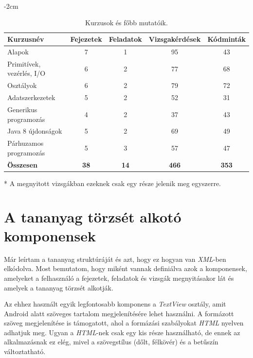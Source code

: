 \documentclass[12pt,a4paper]{article}
\newcommand{\xml}{\textit{XML}\xspace}
\begin{document}
	\bigskip
	\begin{table}[h!]
		\centering
		\addtolength{\leftskip} {-2cm} %
		\addtolength{\rightskip}{-2cm}
		\begin{threeparttable}	
			\begin{tabular}{|l|c|c|c|c|}
				\hline
				\textbf{Kurzusnév} & \textbf{Fejezetek} & \textbf{Feladatok} & \textbf{Vizsgakérdések}\tnote{*} & \textbf{Kódminták} \\
				\hline
				Alapok 						& 7 & 1 & 95 & 43 \\
				\hline
				Primitívek, vezérlés, I/O 	& 6 & 2 & 77 & 68 \\
				\hline
				Osztályok 					& 6 & 2 & 79 & 72  \\
				\hline
				Adatszerkezetek				& 5 & 2 & 52 & 31 \\
				\hline
				Generikus programozás		& 4 & 2 & 37 & 43 \\
				\hline
				Java 8 újdonságok 			& 5 & 2 & 69 & 49 \\
				\hline
				Párhuzamos programozás 		& 5 & 3 & 57 & 47 \\
				\hline
				\textbf{Összesen} 			& \textbf{38} & \textbf{14} & \textbf{466} & \textbf{353} \\
				\hline
			\end{tabular}
			\begin{tablenotes}
				\item[*] A megnyitott vizsgákban ezeknek csak egy része jelenik meg egyszerre.
			\end{tablenotes}
		\end{threeparttable}
		\caption{Kurzusok és főbb mutatóik.}
		\label{kurzusok_tablazat}
	\end{table}
	
	\section{A tananyag törzsét alkotó komponensek}\label{tananyag_torzse}

	Már leírtam a tananyag struktúráját és azt, hogy ez hogyan van \xml-ben elkódolva. Most bemutatom, hogy miként vannak definiálva azok a komponensek, amelyeket a felhasználó a fejezetek, feladatok és vizsgák megnyitásakor lát és amelyek a tananyag törzsét alkotják.
	
	Az ehhez használt egyik legfontosabb komponens a \textit{TextView} osztály, amit Android alatt szöveges tartalom megjelenítésére lehet használni. A formázott szöveg megjelenítése is támogatott, ahol a formázási szabályokat \textit{HTML} nyelven adhatjuk meg. Ugyan a \textit{HTML}-nek csak egy kis része használható, de ennek az alkalmazásnak ez elég, mivel a szövegstílus (dőlt, félkövér) és a betűszín változtatható.
	
\end{document}
